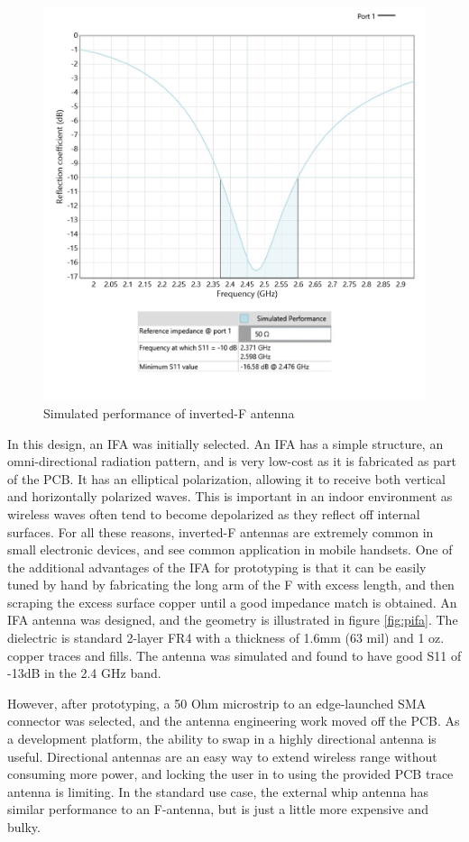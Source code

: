 \begin{figure}[h]
\centering
\includegraphics[width=0.5\linewidth]{images/antenna-performance}
\caption[IFA Performance]{Simulated performance of inverted-F antenna}
\label{fig:pifaperf}
\end{figure}

In this design, an IFA was initially selected. An IFA has a simple structure, an omni-directional radiation pattern, and is very low-cost as it is fabricated as part of the PCB. It has an elliptical polarization, allowing it to receive both vertical and horizontally polarized waves\cite{huynh2000numerical}. This is important in an indoor environment as wireless waves often tend to become depolarized as they reflect off internal surfaces. For all these reasons, inverted-F antennas are extremely common in small electronic devices, and see common application in mobile handsets. One of the additional advantages of the IFA for prototyping is that it can be easily tuned by hand by fabricating the long arm of the F with excess length, and then scraping the excess surface copper until a good impedance match is obtained. An IFA antenna was designed, and the geometry is illustrated in figure \ref{fig:pifa}. The dielectric is standard 2-layer FR4 with a thickness of 1.6mm (63 mil) and 1 oz. copper traces and fills. The antenna  was simulated and found to have good S11 of -13dB in the 2.4 GHz band. 

However, after prototyping, a 50 Ohm microstrip to an edge-launched SMA connector was selected, and the antenna engineering work moved off the PCB. As a development platform, the ability to swap in a highly directional antenna is useful. Directional antennas are an easy way to extend wireless range without consuming more power, and locking the user in to using the provided PCB trace antenna is limiting. In the standard use case, the external whip antenna has similar performance to an F-antenna, but is just a little more expensive and bulky.

